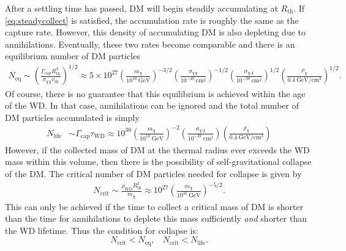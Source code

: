 \documentclass[preprintnumbers,amsmath,amssymb,prd,superscriptaddress]{revtex4}
\newcommand{\GeV}{\text{GeV}}
\newcommand{\cm}{\text{cm}}
\def\r{\right)}
\def\l{\left(}
\begin{document}
After a settling time has passed, DM will begin steadily accumulating at $R_\text{th}$.
If \eqref{eq:steadycollect} is satisfied, the accumulation rate is roughly the same as the capture rate. 
However, this density of accumulating DM is also depleting due to annihilations. 
Eventually, these two rates become comparable and there is an equilibrium number of DM particles
\begin{align}
N_\text{eq} \sim \l \frac{\Gamma_\text{cap} R_\text{th}^3}{\sigma_{\chi \chi} v_\text{th}} \r^{1/2} \approx 5 \times 10^{27} \l \frac{m_\chi}{10^{10} ~\GeV} \r^{-3/2} \l \frac{\sigma_{\chi \chi}}{10^{-40} ~\cm^2} \r^{-1/2}  \l \frac{\sigma_{\chi A}}{10^{-38} ~\cm^2} \r^{1/2} \l \frac{\rho_\chi}{0.4 ~\GeV/\cm^3} \r^{1/2}.
\end{align}
Of course, there is no guarantee that this equilibrium is achieved within the age of the WD. 
In that case, annihilations can be ignored and the total number of DM particles accumulated is simply
\begin{align}
N_\text{life} &\sim \Gamma_\text{cap} \tau_\text{WD} \approx 10^{30}  \l \frac{m_\chi}{10^{10} ~\GeV} \r^{-2}  \l \frac{\sigma_{\chi A}}{10^{-38} ~\cm^2} \r \l \frac{\rho_\chi}{0.4 ~\GeV/\cm^3} \r
\end{align}
However, if the collected mass of DM at the thermal radius ever exceeds the WD mass within this volume, then there is the possibility of self-gravitational collapse of the DM.
The critical number of DM particles needed for collapse is given by
\begin{align}
\label{eq:Ncore}
    N_\text{crit} \sim \frac{\rho_\text{WD} R^3_\text{th}}{m_\chi} \approx 10^{27} \l \frac{m_\chi}{10^{10} ~\GeV} \r^{-5/2}.
\end{align}
This can only be achieved if the time to collect a critical mass of DM is shorter than the time for annihilations to deplete this mass sufficiently \emph{and} shorter than the WD lifetime. 
Thus the condition for collapse is:
\begin{equation}
\label{eq:collapsecondition}
N_\text{crit} < N_\text{eq}, ~~~~ N_\text{crit} < N_\text{life}. 
\end{equation}
\end{document}
